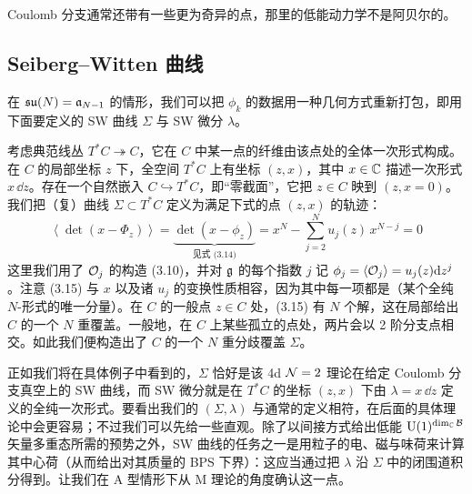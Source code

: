 
Coulomb 分支通常还带有一些更为奇异的点，那里的低能动力学不是阿贝尔的。

\subsection{Seiberg--Witten 曲线}

 在 $\mathfrak{su}(N)=\mathfrak a_{N-1}$ 的情形，我们可以把 $\phi_k$ 的数据用一种几何方式重新打包，即用下面要定义的 SW 曲线 $\Sigma$ 与 SW 微分 $\lambda$。

考虑典范线丛 $T^*C\twoheadrightarrow C$，它在 $C$ 中某一点的纤维由该点处的全体一次形式构成。在 $C$ 的局部坐标 $z$ 下，全空间 $T^*C$ 上有坐标 $(z,x)$，其中 $x\in\mathbb{C}$ 描述一次形式 $x\,\dd z$。存在一个自然嵌入 $C\hookrightarrow T^*C$，即“零截面”，它把 $z\in C$ 映到 $(z,x=0)$。我们把（复）曲线 $\Sigma\subset T^*C$ 定义为满足下式的点 $(z,x)$ 的轨迹：
\begin{equation}
  \left\langle \det(x-\Phi_z)\right\rangle
  = \underbrace{\det(x-\phi_z)}_{\text{见式 (3.14)}}
  = x^N-\sum_{j=2}^{N}u_j(z)\,x^{N-j}=0
  \tag{3.15}
\end{equation}
这里我们用了 $\mathcal{O}_j$ 的构造 (3.10)，并对 $\mathfrak{g}$ 的每个指数 $j$ 记 $\phi_j=\langle\mathcal{O}_j\rangle=u_j(z)\mathrm{d} z^j$。注意 (3.15) 与 $x$ 以及诸 $u_j$ 的变换性质相容，因为其中每一项都是（某个全纯 $N$-形式的唯一分量）。在 $C$ 的一般点 $z\in C$ 处，(3.15) 有 $N$ 个解，这在局部给出 $C$ 的一个 $N$ 重覆盖。一般地，在 $C$ 上某些孤立的点处，两片会以 2 阶分支点相交。如此我们便构造出了 $C$ 的一个 $N$ 重分歧覆盖 $\Sigma$。


正如我们将在具体例子中看到的，$\Sigma$ 恰好是该 4d $\mathcal{N}=2$ 理论在给定 Coulomb 分支真空上的 SW 曲线，而 SW 微分就是在 $T^*C$ 的坐标 $(z,x)$ 下由 $\lambda=x\,\dd z$ 定义的全纯一次形式。要看出我们的 $(\Sigma,\lambda)$ 与通常的定义相符，在后面的具体理论中会更容易；不过我们可以先给一些直观。除了以间接方式给出低能 $\mathrm{U}(1)^{\dim_{\mathbb{C}}\mathcal{B}}$ 矢量多重态所需的预势之外，SW 曲线的任务之一是用粒子的电、磁与味荷来计算其中心荷（从而给出对其质量的 BPS 下界）：这应当通过把 $\lambda$ 沿 $\Sigma$ 中的闭围道积分得到。让我们在 A 型情形下从 M 理论的角度确认这一点。

